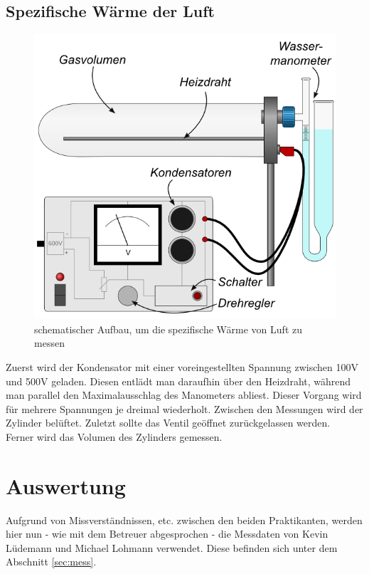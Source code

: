 \documentclass[12pt,a4paper,titlepage,headinclude,bibtotoc]{scrartcl}
\begin{document}
\subsection{Spezifische Wärme der Luft}
\begin{figure}[!htb]
 \centering
 \includegraphics[scale=0.7]{SpezWaermeSkizze.jpg}
 \caption{schematischer Aufbau, um die spezifische Wärme von Luft zu messen \cite{lp}}
 \label{fig:SWLSkizze}
\end{figure}
Zuerst wird der Kondensator mit einer voreingestellten Spannung zwischen 100V und 500V geladen.
Diesen entlädt man daraufhin über den Heizdraht, während man parallel den Maximalausschlag des Manometers abliest.
Dieser Vorgang wird für mehrere Spannungen je dreimal wiederholt.
Zwischen den Messungen wird der Zylinder belüftet.
Zuletzt sollte das Ventil geöffnet zurückgelassen werden.\\
Ferner wird das Volumen des Zylinders gemessen.

\section{Auswertung}
\label{sec:auswertung}
Aufgrund von Missverständnissen, etc. zwischen den beiden Praktikanten, werden hier nun - wie mit dem Betreuer abgesprochen - die Messdaten von Kevin Lüdemann und Michael Lohmann verwendet.
Diese befinden sich unter dem Abschnitt \ref{sec:mess}.
\end{document}
